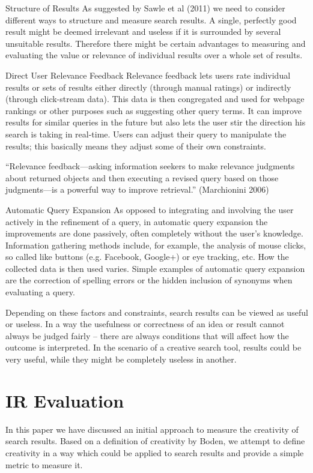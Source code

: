 Structure of Results  As suggested by Sawle et al (2011) we need to consider different ways to structure and measure search results. A single, perfectly good result might be deemed irrelevant and useless if it is surrounded by several unsuitable results. Therefore there might be certain advantages to measuring and evaluating the value or relevance of individual results over a whole set of results.

Direct User Relevance Feedback   Relevance feedback lets users rate individual results or sets of results either directly (through manual ratings) or indirectly (through click-stream data). This data is then congregated and used for webpage rankings or other purposes such as suggesting other query terms. It can improve results for similar queries in the future but also lets the user stir the direction his search is taking in real-time. Users can adjust their query to manipulate the results; this basically means they adjust some of their own constraints.

``Relevance feedback—asking information seekers to make relevance judgments about returned objects and then executing a revised query based on those judgments—is a powerful way to improve retrieval.'' (Marchionini 2006)

Automatic Query Expansion   As opposed to integrating and involving the user actively in the refinement of a query, in automatic query expansion the improvements are done passively, often completely without the user’s knowledge. Information gathering methods include, for example, the analysis of mouse clicks, so called like buttons (e.g. Facebook, Google+) or eye tracking, etc. How the collected data is then used varies. Simple examples of automatic query expansion are the correction of spelling errors or the hidden inclusion of synonyms when evaluating a query.

Depending on these factors and constraints, search results can be viewed as useful or useless. In a way the usefulness or correctness of an idea or result cannot always be judged fairly – there are always conditions that will affect how the outcome is interpreted. In the scenario of a creative search tool, results could be very useful, while they might be completely useless in another.


\section{IR Evaluation}

In this paper \citep{Sawle2011} we have discussed an initial approach to measure the creativity of search results. Based on a definition of creativity by Boden, we attempt to define creativity in a way which could be applied to search results and provide a simple metric to measure it.

